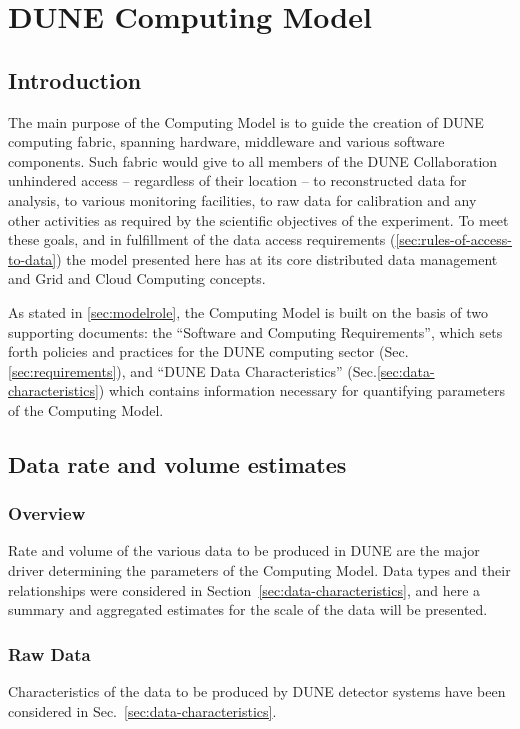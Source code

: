 \section{DUNE Computing Model}
\label{sec:computing_model}

\subsection{Introduction}
The main purpose of the Computing Model is to guide the creation of DUNE computing fabric, spanning
hardware, middleware and various software components. Such fabric would give to all members of the DUNE
Collaboration unhindered access -- regardless of their location -- to reconstructed data for analysis, to various monitoring facilities,
to raw data for calibration and any other activities as required by the scientific objectives of the experiment. To meet these goals,
and in fulfillment of the data access requirements (\ref{sec:rules-of-access-to-data})
the model presented here has at  its core distributed data management and Grid and Cloud Computing concepts.

As stated in \ref{sec:modelrole}, the Computing Model is built on the basis of two supporting documents: the
``Software and Computing Requirements'', which sets forth policies and practices for the DUNE computing sector
(Sec.\ref{sec:requirements}), and ``DUNE Data Characteristics'' (Sec.\ref{sec:data-characteristics}) which contains information
necessary for quantifying parameters of the Computing Model.

\subsection{Data rate and volume estimates}

\subsubsection{Overview}
Rate and volume of the various data to be produced in DUNE are the major driver determining the parameters
of the Computing Model. Data types and their relationships were considered in Section~\ref{sec:data-characteristics},
and here a summary and aggregated estimates for the scale of the data will be presented.

\subsubsection{Raw Data}
Characteristics of the data to be produced by DUNE detector systems have been considered in
Sec.~\ref{sec:data-characteristics}.

